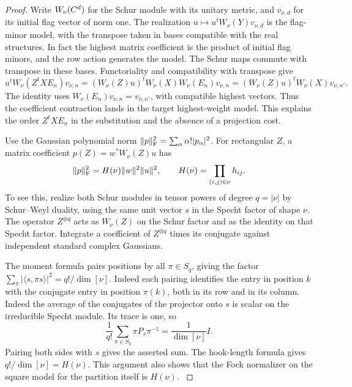 \begin{proof}
Write \(W_\nu(C^d)\) for the Schur module with its unitary
metric, and \(v_{\nu,d}\) for its initial flag vector of norm
one. The realization \(u\mapsto u^t W_\nu(Y)v_{\nu,d}\)
is the flag-minor model, with the transpose taken in bases
compatible with the real structures. In fact the highest
matrix coefficient is the product of initial flag minors,
and the row action generates the model. The Schur maps
commute with transpose in these bases. Functoriality and compatibility with transpose give
\[
 u^tW_\nu(Z^t X E_n)v_{\nu,n}
 =(W_\nu(Z)u)^t W_\nu(X) W_\nu(E_n)v_{\nu,n}
 =(W_\nu(Z)u)^t W_\nu(X)v_{\nu,n'} .
\] The identity uses
\(W_\nu(E_n)v_{\nu,n}=v_{\nu,n'}\), with compatible highest
vectors. Thus the coefficient contraction lands in the
target highest-weight model. This explains the order
\(Z^tX E_n\) in the substitution and the absence of a
projection cost.

Use the Gaussian polynomial norm
\(\|p\|_{\rm F}^2=\sum_\alpha\alpha!|p_\alpha|^2\).
For rectangular \(Z\), a matrix coefficient
\(p(Z)=w^*W_\nu(Z)u\) has
\begin{equation}\label{eq:selected-fock-matrix}
 \|p\|_{\rm F}^2=H(\nu)\|w\|^2\|u\|^2,\qquad
 H(\nu)=\prod_{(i,j)\in\nu} h_{ij}.
\end{equation}
To see this, realize both Schur modules in tensor powers of
degree \(q=|\nu|\) by Schur--Weyl duality, using the same
unit vector \(s\) in the Specht factor of shape \(\nu\).
The operator \(Z^{\otimes q}\) acts as \(W_\nu(Z)\) on
the Schur factor and as the identity on that Specht factor.
Integrate a coefficient of \(Z^{\otimes q}\) times its
conjugate against independent standard complex Gaussians.

The moment formula pairs positions by all \(\pi\in S_q\),
giving the factor
\(\sum_\pi |\langle s,\pi s\rangle|^2=q!/\dim[\nu]\).
Indeed each pairing identifies the entry in position \(k\)
with the conjugate entry in position \(\pi(k)\), both in
its row and in its column. Indeed the average of the conjugates of the projector onto \(s\)
is scalar on the irreducible Specht module. Its trace is one, so
\[
 \frac{1}{q!}\sum_{\pi\in S_q}\pi P_s\pi^{-1}
     =\frac{1}{\dim[\nu]}I .
\]
Pairing both sides with \(s\) gives the asserted sum. The hook-length
formula gives \(q!/\dim[\nu]=H(\nu)\). This argument also
shows that the Fock normalizer on the square model for the
partition itself is \(H(\nu)\).
\cite{frame-robinson-thrall}


\end{proof}
